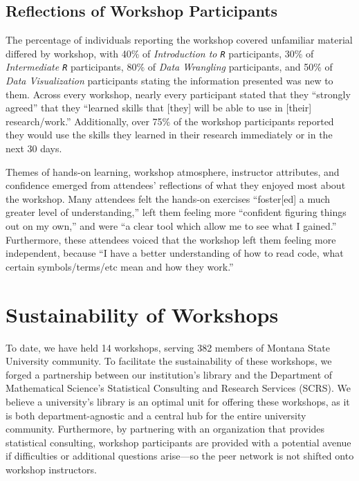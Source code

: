 \documentclass[12pt]{article}
\begin{document}

\subsection{Reflections of Workshop Participants} 

\noindent The percentage of individuals reporting the workshop covered 
unfamiliar material differed by workshop, with 40\% of \emph{Introduction
to \texttt{R}} participants, 30\% of \emph{Intermediate \texttt{R}}
participants, 80\% of \emph{Data Wrangling} participants, and 50\% of 
\emph{Data Visualization} participants stating the information presented was
new to them. Across every workshop, nearly every participant stated that they
``strongly agreed'' that they ``learned skills that [they] will be able to use
in [their] research/work.'' Additionally, over 75\% of the workshop participants
reported they would use the skills they learned in their research immediately or
in the next 30 days. 

\quad Themes of hands-on learning, workshop atmosphere, instructor attributes,
and confidence emerged from attendees' reflections of what they enjoyed most
about the workshop. Many attendees felt the hands-on exercises ``foster[ed] a
much greater level of understanding,'' left them feeling more ``confident
figuring things out on my own,'' and were ``a clear tool which allow me to see
what I gained.'' Furthermore, these attendees voiced that the workshop left them
feeling more independent, because ``I have a better understanding of how to read
code, what certain symbols/terms/etc mean and how they work.'' 

\section{Sustainability of Workshops}  
\label{sec:sustainability}

To date, we have held 14 workshops, serving 382 members of Montana State 
University community. To facilitate the sustainability of these workshops, we
forged a partnership between our institution's library and the Department of
Mathematical Science's Statistical Consulting and Research Services (SCRS). We
believe a university's library is an optimal unit for offering these workshops,
as it is both department-agnostic and a central hub for the entire university
community. Furthermore, by partnering with an organization that provides
statistical consulting, workshop participants are provided with a potential
avenue if difficulties or additional questions arise---so the peer network is
not shifted onto workshop instructors. 
\end{document}
